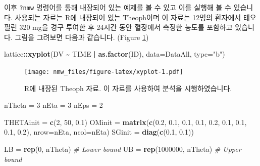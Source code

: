 \documentclass[
  12pt,
]{krantz}
\makeatletter
\newenvironment{Shaded}{\begin{snugshade}}{\end{snugshade}}
\newcommand{\CommentTok}[1]{\textcolor[rgb]{0.56,0.35,0.01}{\textit{#1}}}
\newcommand{\DataTypeTok}[1]{\textcolor[rgb]{0.13,0.29,0.53}{#1}}
\newcommand{\DecValTok}[1]{\textcolor[rgb]{0.00,0.00,0.81}{#1}}
\newcommand{\FloatTok}[1]{\textcolor[rgb]{0.00,0.00,0.81}{#1}}
\newcommand{\KeywordTok}[1]{\textcolor[rgb]{0.13,0.29,0.53}{\textbf{#1}}}
\newcommand{\NormalTok}[1]{#1}
\newcommand{\OperatorTok}[1]{\textcolor[rgb]{0.81,0.36,0.00}{\textbf{#1}}}
\newcommand{\StringTok}[1]{\textcolor[rgb]{0.31,0.60,0.02}{#1}}
\newenvironment{kframe}{%
\medskip{}
\setlength{\fboxsep}{.8em}
 \def\at@end@of@kframe{}%
 \ifinner\ifhmode%
  \def\at@end@of@kframe{\end{minipage}}%
  \begin{minipage}{\columnwidth}%
 \fi\fi%
 \def\FrameCommand##1{\hskip\@totalleftmargin \hskip-\fboxsep
 \colorbox{shadecolor}{##1}\hskip-\fboxsep
     \hskip-\linewidth \hskip-\@totalleftmargin \hskip\columnwidth}%
 \MakeFramed {\advance\hsize-\width
   \@totalleftmargin\z@ \linewidth\hsize
   \@setminipage}}%
 {\par\unskip\endMakeFramed%
 \at@end@of@kframe}
\renewenvironment{Shaded}{\begin{kframe}}{\end{kframe}}
\makeatother
\begin{document}
이후 \texttt{?nmw} 명령어를 통해 내장되어 있는 예제를 볼 수 있고 이를 실행해 볼 수 있습니다. 사용되는 자료는 R에 내장되어 있는 Theoph이며 이 자료는 12명의 환자에서 테오필린 320 mg을 경구 투여한 후 24시간 동안 혈장에서 측정한 농도를 포함하고 있습니다. 그림을 그려보면 다음과 같습니다. (Figure \ref{fig:xyplot})

\begin{Shaded}
\begin{Highlighting}[]
\NormalTok{lattice}\OperatorTok{::}\KeywordTok{xyplot}\NormalTok{(DV }\OperatorTok{\textasciitilde{}}\StringTok{ }\NormalTok{TIME }\OperatorTok{|}\StringTok{ }\KeywordTok{as.factor}\NormalTok{(ID), }\DataTypeTok{data=}\NormalTok{DataAll, }\DataTypeTok{type=}\StringTok{"b"}\NormalTok{)}
\end{Highlighting}
\end{Shaded}

\begin{figure}
\centering
\texttt{[image: nmw\_files/figure-latex/xyplot-1.pdf]}
\caption{\label{fig:xyplot}R에 내장된 Theoph 자료. 이 자료를 사용하여 분석을 시행하였습니다.}
\end{figure}



\begin{Shaded}
\begin{Highlighting}[]
\NormalTok{nTheta =}\StringTok{ }\DecValTok{3}
\NormalTok{nEta =}\StringTok{ }\DecValTok{3}
\NormalTok{nEps =}\StringTok{ }\DecValTok{2}

\NormalTok{THETAinit =}\StringTok{ }\KeywordTok{c}\NormalTok{(}\DecValTok{2}\NormalTok{, }\DecValTok{50}\NormalTok{, }\FloatTok{0.1}\NormalTok{) }
\NormalTok{OMinit =}\StringTok{ }\KeywordTok{matrix}\NormalTok{(}\KeywordTok{c}\NormalTok{(}\FloatTok{0.2}\NormalTok{, }\FloatTok{0.1}\NormalTok{, }\FloatTok{0.1}\NormalTok{, }\FloatTok{0.1}\NormalTok{, }\FloatTok{0.2}\NormalTok{, }\FloatTok{0.1}\NormalTok{, }\FloatTok{0.1}\NormalTok{, }\FloatTok{0.1}\NormalTok{, }\FloatTok{0.2}\NormalTok{), }
                \DataTypeTok{nrow=}\NormalTok{nEta, }\DataTypeTok{ncol=}\NormalTok{nEta)}
\NormalTok{SGinit =}\StringTok{ }\KeywordTok{diag}\NormalTok{(}\KeywordTok{c}\NormalTok{(}\FloatTok{0.1}\NormalTok{, }\FloatTok{0.1}\NormalTok{))}

\NormalTok{LB =}\StringTok{ }\KeywordTok{rep}\NormalTok{(}\DecValTok{0}\NormalTok{, nTheta) }\CommentTok{\# Lower bound}
\NormalTok{UB =}\StringTok{ }\KeywordTok{rep}\NormalTok{(}\DecValTok{1000000}\NormalTok{, nTheta) }\CommentTok{\# Upper bound}
\end{Highlighting}
\end{Shaded}
\end{document}
